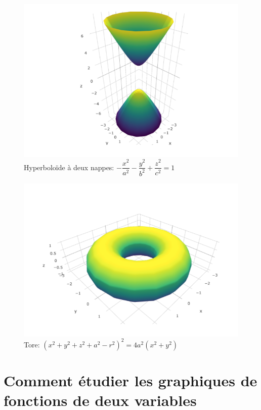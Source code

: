 \documentclass[]{book}
\theoremstyle{definition}
\theoremstyle{definition}
\theoremstyle{definition}
\theoremstyle{remark}
\begin{document}
\begin{figure}

{\centering \includegraphics[width=0.8\linewidth]{resources/images/hyper2nappe} 

}

\caption{Hyperboloïde à deux nappes: $-\dfrac{x^2}{a^2}-\dfrac{y^2}{b^2}+\dfrac{z^2}{c^2}=1$}\label{fig:hyper2nappe}
\end{figure}

\begin{figure}

{\centering \includegraphics[width=0.8\linewidth]{resources/images/tore} 

}

\caption{Tore: $(x^2+y^2+z^2+a^2-r^2)^2=4 a^2(x^2+y^2)$}\label{fig:tore}
\end{figure}

\hypertarget{comment-etudier-les-graphiques-de-fonctions-de-deux-variables}{%
\section{Comment étudier les graphiques de fonctions de deux
variables}\label{comment-etudier-les-graphiques-de-fonctions-de-deux-variables}}
\end{document}
